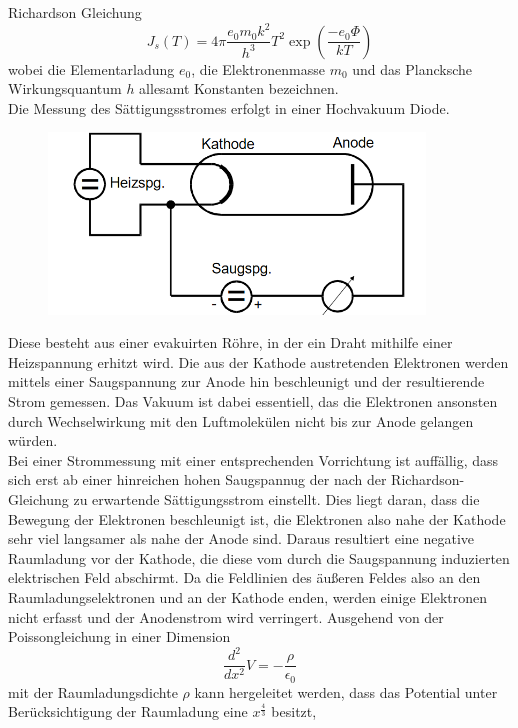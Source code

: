 Richardson Gleichung
\begin{equation}
    \label{eq:richardson}
J_s(T)=4\pi\frac{e_0m_0k^2}{h^3}T^2\exp(\frac{-e_0\Phi}{kT})
\end{equation}
wobei die Elementarladung $e_0$, die Elektronenmasse $m_0$ und das Plancksche Wirkungsquantum $h$ allesamt Konstanten bezeichnen. \\
Die Messung des Sättigungsstromes erfolgt in einer Hochvakuum Diode.
\begin{figure}[h]
    \centering
    \includegraphics[width=10cm, keepaspectratio]{Hochvakuum-Diode}
  \end{figure}
Diese besteht aus einer evakuirten Röhre, in der ein Draht mithilfe einer
Heizspannung erhitzt wird. Die aus der Kathode austretenden Elektronen werden mittels einer Saugspannung zur Anode hin beschleunigt
und der resultierende Strom gemessen. Das Vakuum ist dabei essentiell, das die Elektronen ansonsten durch Wechselwirkung mit den Luftmolekülen nicht 
bis zur Anode gelangen würden. \\
Bei einer Strommessung mit einer entsprechenden Vorrichtung ist auffällig, dass sich erst ab einer hinreichen hohen Saugspannug 
der nach der Richardson-Gleichung zu erwartende Sättigungsstrom einstellt. Dies liegt daran, dass die Bewegung der Elektronen beschleunigt ist,
die Elektronen also nahe der Kathode sehr viel langsamer als nahe der Anode sind. Daraus resultiert eine negative Raumladung vor der Kathode,
die diese vom durch die Saugspannung induzierten elektrischen Feld abschirmt. Da die Feldlinien des äußeren Feldes also an den Raumladungselektronen 
und an der Kathode enden, werden einige Elektronen nicht erfasst und der Anodenstrom wird verringert.
Ausgehend von der Poissongleichung in einer Dimension 
\begin{equation}
\frac{d^2}{dx^2}V=-\frac{\rho}{\epsilon_0}
\end{equation}
mit der Raumladungsdichte $\rho$ kann hergeleitet werden, dass das Potential unter Berücksichtigung der Raumladung eine $x^{\frac{4}{3}}$ besitzt, 

